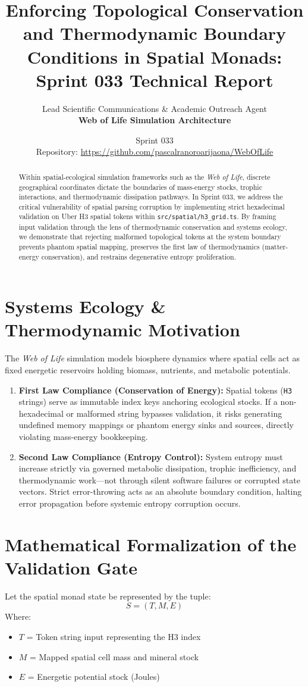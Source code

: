 \documentclass[11pt, a4paper]{article}
\title{\textbf{Enforcing Topological Conservation and Thermodynamic Boundary Conditions in Spatial Monads: Sprint 033 Technical Report}}
\author{Lead Scientific Communications \& Academic Outreach Agent \\ \textbf{Web of Life Simulation Architecture}}
\date{Sprint 033 \\ Repository: \url{https://github.com/pascalranoroarijaona/WebOfLife}}
\begin{document}
\maketitle

\begin{abstract}
Within spatial-ecological simulation frameworks such as the \emph{Web of Life}, discrete geographical coordinates dictate the boundaries of mass-energy stocks, trophic interactions, and thermodynamic dissipation pathways. In Sprint 033, we address the critical vulnerability of spatial parsing corruption by implementing strict hexadecimal validation on Uber H3 spatial tokens within \texttt{src/spatial/h3\_grid.ts}. By framing input validation through the lens of thermodynamic conservation and systems ecology, we demonstrate that rejecting malformed topological tokens at the system boundary prevents phantom spatial mapping, preserves the first law of thermodynamics (matter-energy conservation), and restrains degenerative entropy proliferation.
\end{abstract}

\section{Systems Ecology \& Thermodynamic Motivation}
The \emph{Web of Life} simulation models biosphere dynamics where spatial cells act as fixed energetic reservoirs holding biomass, nutrients, and metabolic potentials. 

\begin{enumerate}
    \item \textbf{First Law Compliance (Conservation of Energy):} Spatial tokens (\texttt{H3} strings) serve as immutable index keys anchoring ecological stocks. If a non-hexadecimal or malformed string bypasses validation, it risks generating undefined memory mappings or phantom energy sinks and sources, directly violating mass-energy bookkeeping.
    \item \textbf{Second Law Compliance (Entropy Control):} System entropy must increase strictly via governed metabolic dissipation, trophic inefficiency, and thermodynamic work---not through silent software failures or corrupted state vectors. Strict error-throwing acts as an absolute boundary condition, halting error propagation before systemic entropy corruption occurs.
\end{enumerate}

\section{Mathematical Formalization of the Validation Gate}
Let the spatial monad state be represented by the tuple:
\begin{equation}
S = (T, M, E)
\end{equation}
Where:
\begin{itemize}
    \item $T$ = Token string input representing the H3 index
    \item $M$ = Mapped spatial cell mass and mineral stock
    \item $E$ = Energetic potential stock (Joules)
\end{itemize}
\end{document}
